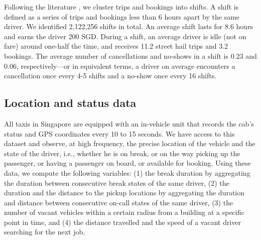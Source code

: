 \documentclass[reviewmode,AEJ]{AEA}
\begin{document}
Following the literature \citep{farber2015you,agarwal2015singaporean}%
, we cluster trips and bookings into shifts. A shift is defined as a series of trips and bookings less than 6 
hours apart by the same driver. %
We identified 2,122,256 shifts in total. An average shift lasts for 8.6 hours and earns the driver 200 SGD. 
During a shift, an average driver is idle (not on fare) around one-half the time, and receives 11.2 street
hail trips and 3.2 bookings. %
The average number of cancellations and no-shows in a shift is 0.23 and 0.06, respectively---or in equivalent terms,
a driver on average encounters a cancellation once every 4-5 shifts and a no-show once every 16 shifts.


\subsection{Location and status data}
All taxis in Singapore are equipped with an in-vehicle unit that records the cab's status and GPS 
coordinates every 10 to 15 seconds. We have access to this dataset and %
observe, at high frequency, the precise location of the vehicle and the state of the driver, i.e., whether he is on break, or on the way picking up the passenger, or having a passenger on board, or available for booking. Using these data, we compute the following variables: (1) the break duration by aggregating the duration between consecutive break states of the same driver, (2) the duration and  the distance to the pickup locations by aggregating the duration and distance between consecutive on-call states of the same driver, (3) the number of vacant vehicles within a certain radius from a building at a specific point in time, and (4) the distance travelled and the speed of a vacant driver searching for the next job. 
\end{document}
